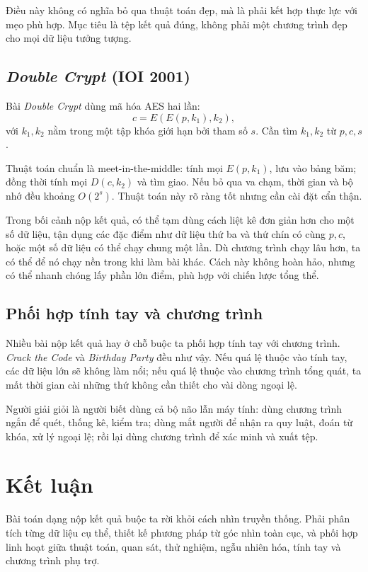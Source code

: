 \documentclass[11pt]{article}
\begin{document}
Điều này không có nghĩa bỏ qua thuật toán đẹp, mà là phải kết hợp thực lực
với mẹo phù hợp. Mục tiêu là tệp kết quả đúng, không phải một chương trình
đẹp cho mọi dữ liệu tưởng tượng.

\subsection{\textit{Double Crypt} (IOI 2001)}

Bài \textit{Double Crypt} dùng mã hóa AES hai lần:
\[
  c=E(E(p,k_1),k_2),
\]
với \(k_1,k_2\) nằm trong một tập khóa giới hạn bởi tham số \(s\). Cần tìm
\(k_1,k_2\) từ \(p,c,s\).

Thuật toán chuẩn là meet-in-the-middle: tính mọi \(E(p,k_1)\), lưu vào bảng
băm; đồng thời tính mọi \(D(c,k_2)\) và tìm giao. Nếu bỏ qua va chạm, thời
gian và bộ nhớ đều khoảng \(O(2^s)\). Thuật toán này rõ ràng tốt nhưng cần
cài đặt cẩn thận.

Trong bối cảnh nộp kết quả, có thể tạm dùng cách liệt kê đơn giản hơn cho
một số dữ liệu, tận dụng các đặc điểm như dữ liệu thứ ba và thứ chín có cùng
\(p,c\), hoặc một số dữ liệu có thể chạy chung một lần. Dù chương trình chạy
lâu hơn, ta có thể để nó chạy nền trong khi làm bài khác. Cách này không hoàn
hảo, nhưng có thể nhanh chóng lấy phần lớn điểm, phù hợp với chiến lược tổng
thể.

\subsection{Phối hợp tính tay và chương trình}

Nhiều bài nộp kết quả hay ở chỗ buộc ta phối hợp tính tay với chương trình.
\textit{Crack the Code} và \textit{Birthday Party} đều như vậy. Nếu quá lệ
thuộc vào tính tay, các dữ liệu lớn sẽ không làm nổi; nếu quá lệ thuộc vào
chương trình tổng quát, ta mất thời gian cài những thứ không cần thiết cho
vài dòng ngoại lệ.

Người giải giỏi là người biết dùng cả bộ não lẫn máy tính: dùng chương trình
ngắn để quét, thống kê, kiểm tra; dùng mắt người để nhận ra quy luật, đoán từ
khóa, xử lý ngoại lệ; rồi lại dùng chương trình để xác minh và xuất tệp.

\section{Kết luận}

Bài toán dạng nộp kết quả buộc ta rời khỏi cách nhìn truyền thống. Phải phân
tích từng dữ liệu cụ thể, thiết kế phương pháp từ góc nhìn toàn cục, và phối
hợp linh hoạt giữa thuật toán, quan sát, thử nghiệm, ngẫu nhiên hóa, tính tay
và chương trình phụ trợ.
\end{document}
